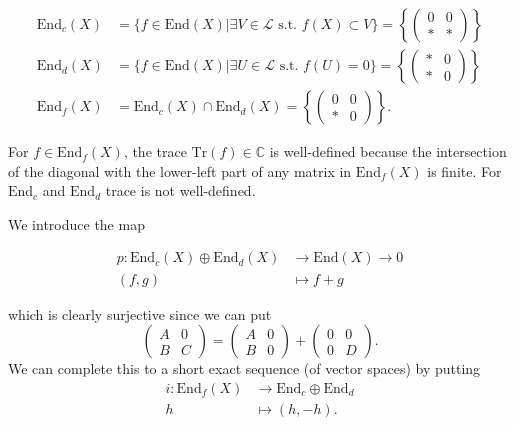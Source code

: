\medskip\noindent
\begin{align*}
\text{End}_c(X)&=\{f \in \text{End}(X)| \exists  V \in \mathcal{L}
\text{ s.t. }f(X) \subset V\}
=\left\{\begin{pmatrix}
0&0\\ 
*&*
\end{pmatrix}\right\}\\
\text{End}_d(X)&=\{f \in \text{End}(X)|\exists U \in \mathcal{L}
\text{ s.t. }f(U)=0\}
=\left\{\begin{pmatrix}
*&0\\ 
*&0
\end{pmatrix}\right\}\\
\text{End}_f(X)&=\text{End}_c(X) \cap \text{End}_d(X)
=\left\{\begin{pmatrix}
0&0\\ 
*&0
\end{pmatrix}\right\}.
\end{align*}

\begin{remark}
\label{remark-trace-in-End}
For $f \in \text{End}_f(X)$,
the trace $\text{Tr}(f) \in \mathbb{C}$
is well-defined because
the intersection of the diagonal
with the lower-left part of any
matrix in $\text{End}_f(X)$ is finite.
For $\text{End}_c$ and $\text{End}_d$
trace is not well-defined.
\end{remark}

\noindent
We introduce the map

\begin{align*}
p:\text{End}_c(X) \oplus \text{End}_d(X)  &\longrightarrow \text{End}(X)\to  0\\
(f,g) &\longmapsto f+g
\end{align*}

\noindent
which is clearly surjective since we can put
$$
\begin{pmatrix}
A&0\\ 
B&C
\end{pmatrix}=\begin{pmatrix}
A&0\\ 
B&0
\end{pmatrix}+
\begin{pmatrix}
0&0\\ 
0&D
\end{pmatrix}.
$$
We can complete this to a short exact sequence 
(of vector spaces)
by putting
\begin{align*}
i:\text{End}_f(X)  &\longrightarrow \text{End}_c \oplus \text{End}_d \\
h &\longmapsto (h,-h).
\end{align*}

